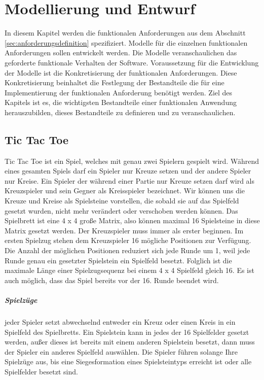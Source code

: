 \chapter{Modellierung und Entwurf}
\label{cha:Modellierung und Entwurf}

In diesem Kapitel werden die funktionalen Anforderungen aus dem Abschnitt \ref{sec:anforderungsdefinition} spezifiziert. Modelle für die einzelnen funktionalen Anforderungen sollen entwickelt werden. Die Modelle veranschaulichen das geforderte funktionale Verhalten der Software. Voraussetzung für die Entwicklung der Modelle ist die Konkretisierung der funktionalen Anforderungen. Diese Konkretisierung beinhaltet die Festlegung der Bestandteile die für eine Implementierung der funktionalen Anforderung benötigt werden. Ziel des Kapitels ist es, die wichtigsten Bestandteile einer funktionalen Anwendung herauszubilden, dieses Bestandteile zu definieren und zu veranschaulichen. 



\section{Tic Tac Toe}
\label{sec:Tic Tac Toe}

Tic Tac Toe ist ein Spiel, welches mit genau zwei Spielern gespielt wird. Während eines gesamten Spiels darf ein Spieler nur Kreuze setzen und der andere Spieler nur Kreise. Ein Spieler der während einer Partie nur Kreuze setzen darf wird als Kreuzspieler und sein Gegner als Kreisspieler bezeichnet. Wir können uns die Kreuze und Kreise als Spielsteine vorstellen, die sobald sie auf das Spielfeld gesetzt wurden, nicht mehr verändert oder verschoben werden können. Das Spielbrett ist eine 4 x 4 große Matrix, also können maximal 16 Spielsteine in diese Matrix gesetzt werden. Der Kreuzspieler muss immer als erster beginnen. Im ersten Spielzug stehen dem Kreuzspieler 16 mögliche Positionen zur Verfügung. Die Anzahl der möglichen Positionen reduziert sich jede Runde um 1, weil jede Runde genau ein gesetzter Spielstein ein Spielfeld besetzt. Folglich ist die maximale Länge einer Spielzugsequenz bei einem 4 x 4 Spielfeld gleich 16. Es ist auch möglich, dass das Spiel bereits vor der 16. Runde beendet wird. \\

\paragraph{Spielzüge} jeder Spieler setzt abwechselnd entweder ein Kreuz oder einen Kreis in ein Spielfeld des Spielbretts. Ein Spielstein kann in jedes der 16 Spielfelder gesetzt werden, außer dieses ist bereits mit einem anderen Spielstein besetzt, dann muss der Spieler ein anderes Spielfeld auswählen. Die Spieler führen solange Ihre Spielzüge aus, bis eine Siegesformation eines Spielsteintyps erreicht ist oder alle Spielfelder besetzt sind. 

